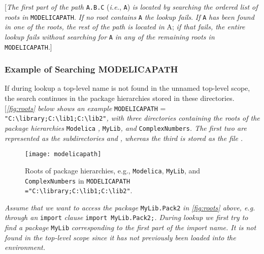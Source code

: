 {[}\emph{The first part of the path} \lstinline!A.B.C! (\emph{i.e.}, \lstinline!A!) \emph{is
located by searching the ordered list of roots in} \lstinline!MODELICAPATH!.
\emph{If no root contains} \lstinline!A! \emph{the lookup fails}. \emph{If} \lstinline!A!
\emph{has been found in one of the roots, the rest of the path is
located in} A; \emph{if that fails, the entire lookup fails without
searching} \emph{for} \lstinline!A! \emph{in any of the remaining roots in}
\lstinline!MODELICAPATH!.{]}

\subsubsection{Example of Searching MODELICAPATH}

If during lookup a top-level name is not found in the unnamed top-level
scope, the search continues in the package hierarchies stored in these
directories. {[}\emph{\autoref{fig:roots} below shows an example} \lstinline!MODELICAPATH! =
\lstinline!"C:\library;C:\lib1;C:\lib2"!\emph{,
with three directories containing the roots of the package hierarchies}
\lstinline!Modelica! \emph{,} \lstinline!MyLib!\emph{, and} \lstinline!ComplexNumbers!\emph{. The first two are represented as the subdirectories}  \emph{and}
\emph{, whereas the third is stored
as the file} \emph{.}

\begin{figure}[H]
\caption{Roots of package hierarchies, e.g.,
\texttt{Modelica}, \texttt{MyLib}, and \texttt{ComplexNumbers} in
\texttt{MODELICAPATH ="C:\textbackslash library;C:\textbackslash lib1;C:\textbackslash lib2"}.}
\label{fig:roots}
\texttt{[image: modelicapath]}
\end{figure}

\emph{Assume that we want to access the package} \lstinline!MyLib.Pack2! \emph{in
\autoref{fig:roots} above, e.g. through an} \lstinline!import! \emph{clause}
\lstinline!import MyLib.Pack2;!\emph{. During lookup we first try to find a package} \lstinline!MyLib!
\emph{corresponding to the first part of the import name. It is not
found in the top-level scope since it has not previously been loaded
into the environment. }

